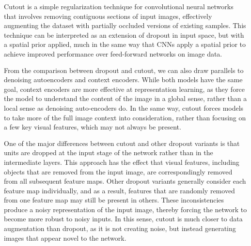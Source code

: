 \documentclass[10pt,twocolumn,letterpaper]{article}
\begin{document}


Cutout is a simple regularization technique for convolutional neural networks that involves removing contiguous sections of input images, effectively augmenting the dataset with partially occluded versions of existing samples. This technique can be interpreted as an extension of dropout in input space, but with a spatial prior applied, much in the same way that CNNs apply a spatial prior to achieve improved performance over feed-forward networks on image data.

From the comparison between dropout and cutout, we can also draw parallels to denoising autoencoders and context encoders. While both models have the same goal, context encoders are more effective at representation learning, as they force the model to understand the content of the image in a global sense, rather than a local sense as denoising auto-encoders do.
In the same way, cutout forces models to take more of the full image context into consideration, rather than focusing on a few key visual features, which may not always be present.

One of the major differences between cutout and other dropout variants is that units are dropped at the input stage of the network rather than in the intermediate layers. This approach has the effect that visual features, including objects that are removed from the input image, are correspondingly removed from all subsequent feature maps. Other dropout variants generally consider each feature map individually, and as a result, features that are randomly removed from one feature map may still be present in others. These inconsistencies produce a noisy representation of the input image, thereby forcing the network to become more robust to noisy inputs. In this sense, cutout is much closer to data augmentation than dropout, as it is not creating noise, but instead generating images that appear novel to the network.
\end{document}
